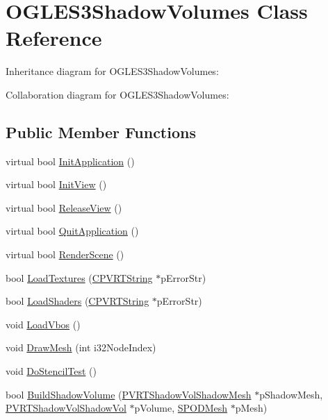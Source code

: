 \hypertarget{class_o_g_l_e_s3_shadow_volumes}{\section{O\+G\+L\+E\+S3\+Shadow\+Volumes Class Reference}
\label{class_o_g_l_e_s3_shadow_volumes}
}


Inheritance diagram for O\+G\+L\+E\+S3\+Shadow\+Volumes\+:


Collaboration diagram for O\+G\+L\+E\+S3\+Shadow\+Volumes\+:
\subsection*{Public Member Functions}
\begin{DoxyCompactItemize}
\item 
virtual bool \hyperlink{class_o_g_l_e_s3_shadow_volumes_ab5f45484444ff3dfce8f06bf14db67c4}{Init\+Application} ()
\item 
virtual bool \hyperlink{class_o_g_l_e_s3_shadow_volumes_a7d8ecc7d68cd71a6d67de38676209b16}{Init\+View} ()
\item 
virtual bool \hyperlink{class_o_g_l_e_s3_shadow_volumes_a04ac2711c08335243e049af4286dc2fa}{Release\+View} ()
\item 
virtual bool \hyperlink{class_o_g_l_e_s3_shadow_volumes_a74d89b378d1a8e475d4faf18f4b7f2f5}{Quit\+Application} ()
\item 
virtual bool \hyperlink{class_o_g_l_e_s3_shadow_volumes_a0398597ec9a6daee94b29605db093480}{Render\+Scene} ()
\item 
bool \hyperlink{class_o_g_l_e_s3_shadow_volumes_a184cb11c9c1a95f2f6ea04e951824e97}{Load\+Textures} (\hyperlink{class_c_p_v_r_t_string}{C\+P\+V\+R\+T\+String} $\ast$p\+Error\+Str)
\item 
bool \hyperlink{class_o_g_l_e_s3_shadow_volumes_ad4977181ecba6c37ad04d35c8d1a7e4c}{Load\+Shaders} (\hyperlink{class_c_p_v_r_t_string}{C\+P\+V\+R\+T\+String} $\ast$p\+Error\+Str)
\item 
void \hyperlink{class_o_g_l_e_s3_shadow_volumes_adcbe88986a594225e8131e53754e8b5f}{Load\+Vbos} ()
\item 
void \hyperlink{class_o_g_l_e_s3_shadow_volumes_a14b1b1625504ab81746353372fa408e4}{Draw\+Mesh} (int i32\+Node\+Index)
\item 
void \hyperlink{class_o_g_l_e_s3_shadow_volumes_ab10a1c411811aa66043bd1db3d2442ac}{Do\+Stencil\+Test} ()
\item 
bool \hyperlink{class_o_g_l_e_s3_shadow_volumes_a8a26baf5c65319e4b7beee2c06cc35d0}{Build\+Shadow\+Volume} (\hyperlink{struct_p_v_r_t_shadow_vol_shadow_mesh}{P\+V\+R\+T\+Shadow\+Vol\+Shadow\+Mesh} $\ast$p\+Shadow\+Mesh, \hyperlink{struct_p_v_r_t_shadow_vol_shadow_vol}{P\+V\+R\+T\+Shadow\+Vol\+Shadow\+Vol} $\ast$p\+Volume, \hyperlink{struct_s_p_o_d_mesh}{S\+P\+O\+D\+Mesh} $\ast$p\+Mesh)

\end{DoxyCompactItemize}
